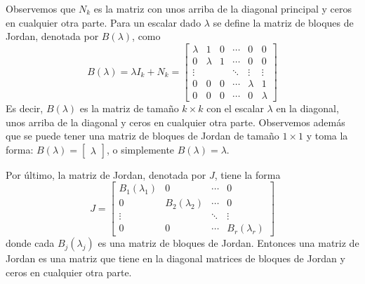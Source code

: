Observemos que $N_k$ es la matriz con unos arriba de la diagonal principal y ceros en cualquier otra parte. Para un escalar dado $\lambda$ se define la matriz de bloques de Jordan, denotada por $B(\lambda)$, como
$$B(\lambda) = \lambda I_k + N_k = \begin{bmatrix}
    \lambda & 1 & 0 & \cdots & 0 & 0 \\
    0 & \lambda & 1 & \cdots & 0 & 0 \\
    \vdots & & & \ddots & \vdots & \vdots \\
    0 & 0 & 0 & \cdots & \lambda & 1 \\
    0 & 0 & 0 & \cdots & 0 & \lambda
\end{bmatrix}$$
Es decir, $B(\lambda)$ es la matriz de tamaño $k \times k$ con el escalar $\lambda$ en la diagonal, unos arriba de la diagonal y ceros en cualquier otra parte. Observemos además que se puede tener una matriz de bloques de Jordan de tamaño $1 \times 1$ y toma la forma: $B(\lambda) = \begin{bmatrix} \lambda \end{bmatrix}$, o simplemente $B(\lambda) = \lambda$.


Por último, la matriz de Jordan, denotada por $J$, tiene la forma
$$J = \begin{bmatrix}
    B_1(\lambda_1) & 0 & \cdots & 0 \\
    0 & B_2(\lambda_2) & \cdots & 0 \\
    \vdots & & \ddots & \vdots \\
    0 & 0 & \cdots & B_r(\lambda_r)
\end{bmatrix}$$
donde cada $B_j(\lambda_j)$ es una matriz de bloques de Jordan. Entonces una matriz de Jordan es una matriz que tiene en la diagonal matrices de bloques de Jordan y ceros en cualquier otra parte.

